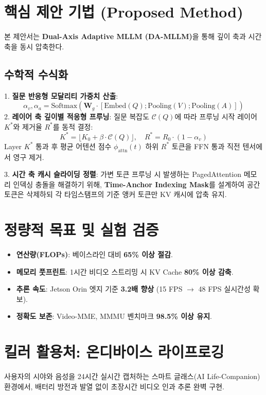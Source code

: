\documentclass[10pt, a4paper, twocolumn]{article}
\begin{document}
\section{핵심 제안 기법 (Proposed Method)}
본 제안서는 \textbf{Dual-Axis Adaptive MLLM (DA-MLLM)}을 통해 깊이 축과 시간 축을 동시 압축한다.

\subsection{수학적 수식화}
1. \textbf{질문 반응형 모달리티 가중치 산출}:
\begin{equation}
\alpha_v, \alpha_a = \text{Softmax}(\mathbf{W}_g \cdot [\text{Embed}(Q); \text{Pooling}(V); \text{Pooling}(A)])
\end{equation}
2. \textbf{레이어 축 깊이별 적응형 프루닝}:
질문 복잡도 $\mathcal{C}(Q)$에 따라 프루닝 시작 레이어 $K^*$와 제거율 $R^*$를 동적 결정:
\begin{equation}
K^* = \lfloor K_0 + \beta \cdot \mathcal{C}(Q) \rfloor, \quad R^* = R_0 \cdot (1 - \alpha_v)
\end{equation}
Layer $K^*$ 통과 후 평균 어텐션 점수 $\phi_{\text{attn}}(t)$ 하위 $R^*$ 토큰을 FFN 통과 직전 텐서에서 영구 제거.

3. \textbf{시간 축 캐시 슬라이딩 정렬}:
가변 토큰 프루닝 시 발생하는 PagedAttention 메모리 인덱싱 충돌을 해결하기 위해, \textbf{Time-Anchor Indexing Mask}를 설계하여 공간 토큰은 삭제하되 각 타임스탬프의 기준 앵커 토큰만 KV 캐시에 압축 유지.

\section{정량적 목표 및 실험 검증}
\begin{itemize}
    \item \textbf{연산량(FLOPs)}: 베이스라인 대비 \textbf{65\% 이상 절감}.
    \item \textbf{메모리 풋프린트}: 1시간 비디오 스트리밍 시 KV Cache \textbf{80\% 이상 감축}.
    \item \textbf{추론 속도}: Jetson Orin 엣지 기준 \textbf{3.2배 향상} (15 FPS $\rightarrow$ 48 FPS 실시간성 확보).
    \item \textbf{정확도 보존}: Video-MME, MMMU 벤치마크 \textbf{98.5\% 이상 유지}.
\end{itemize}

\section{킬러 활용처: 온디바이스 라이프로깅}
사용자의 시야와 음성을 24시간 실시간 캡처하는 스마트 글래스(AI Life-Companion) 환경에서, 배터리 방전과 발열 없이 초장시간 비디오 인과 추론 완벽 구현.
\end{document}
